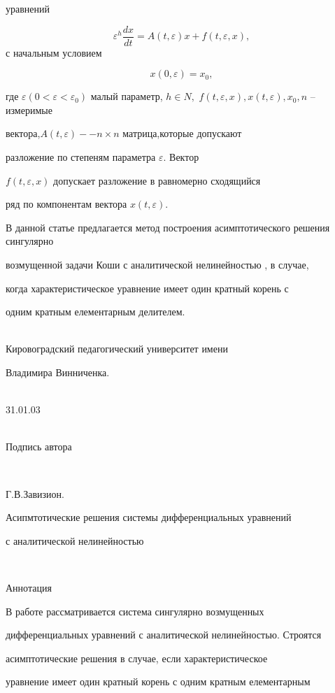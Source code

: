 уравнений


$$\varepsilon^{h}\frac{dx}{dt}=A(t,\varepsilon)x+f(t,\varepsilon,x),$$с начальным условием


$$x(0,\varepsilon)=x_{0},$$


 где $\varepsilon


(0<\varepsilon<\varepsilon_{0})$ малый параметр, $h\in N,$ $


f(t,\varepsilon,x), x(t,\varepsilon),x_{0}, n$ -- измеримые


вектора,$A(t,\varepsilon) --n\times n$ матрица,которые допускают


разложение по степеням параметра $\varepsilon.$ Вектор


$f(t,\varepsilon,x)$ допускает разложение в равномерно сходящийся


ряд по компонентам вектора $x(t,\varepsilon).$


 В данной статье предлагается метод построения асимптотического решения сингулярно


возмущенной задачи Коши с аналитической нелинейностью , в случае,


когда характеристическое уравнение имеет один кратный корень с


одним кратным елементарным делителем.


\\ Кировоградский педагогический университет имени


Владимира Винниченка.


 \\31.01.03


\\Подпись автора


\newpage


\\


 Г.В.Завизион.


 Асипмтотические решения системы дифференциальных уравнений


с аналитической нелинейностью


\\\centerline{Аннотация}


 В работе рассматривается система сингулярно возмущенных


дифференциальных уравнений с аналитической нелинейностью. Строятся


асимптотические решения в случае, если характеристическое


уравнение имеет один кратный корень с одним кратным елементарным



